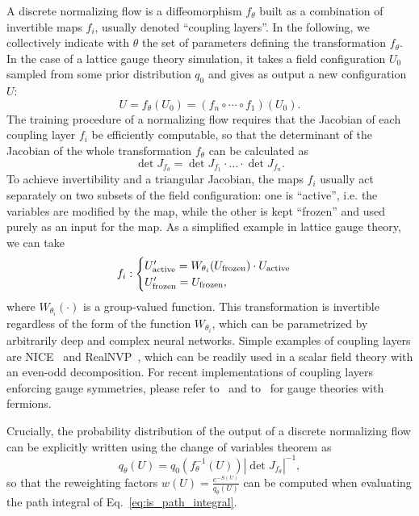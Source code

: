 \documentclass[12pt]{article}
\begin{document}
A discrete normalizing flow is a diffeomorphism $f_\theta$ built as a combination of invertible maps $f_i$, usually denoted ``coupling layers''. In the following, we collectively indicate with $\theta$ the set of parameters defining the transformation $f_\theta$.
In the case of a lattice gauge theory simulation, it takes a field configuration $U_0$ sampled from some prior distribution $q_0$ and gives as output a new configuration $U$:
\begin{equation}
\label{eq:nf_def}
    U = f_\theta (U_0) = (f_n \circ \cdots \circ f_1 )(U_0).
\end{equation}
The training procedure of a normalizing flow requires that the Jacobian of each coupling layer $f_i$ be efficiently computable, so that the determinant of the Jacobian of the whole transformation $f_\theta$ can be calculated as
\begin{equation}
    \det J_{f_\theta} = \det J_{f_1} \cdot \ldots \cdot \det J_{f_n}.
\end{equation}
To achieve invertibility and a triangular Jacobian, the maps $f_i$ usually act separately on two subsets of the field configuration: one is ``active'', i.e. the variables are modified by the map, while the other is kept ``frozen'' and used purely as an input for the map. As a simplified example in lattice gauge theory, we can take
\begin{equation}
f_i:
    \begin{cases}
        U'_{\rm active} = W_{\theta_i} (U_{\rm frozen}) \cdot U_{\rm active} \\
        U'_{\rm frozen} = U_{\rm frozen},
    \end{cases}
\end{equation}
where $W_{\theta_i}(\cdot)$ is a group-valued function.
This transformation is invertible regardless of the form of the function $W_{\theta_i}$, which can be parametrized by arbitrarily deep and complex neural networks. Simple examples of coupling layers are NICE~\cite{dinh2014nice} and RealNVP~\cite{dinh2016density}, which can be readily used in a scalar field theory with an even-odd decomposition. For recent implementations of coupling layers enforcing gauge symmetries, please refer to~\cite{Kanwar:2020xzo,Nagai:2021bhh,Abbott:2023thq} and to~\cite{Albergo:2021bna,Abbott:2022zhs} for gauge theories with fermions. 

Crucially, the probability distribution of the output of a discrete normalizing flow can be explicitly written using the change of variables theorem as
\begin{equation} \label{eq:flow_density}
    q_\theta (U) = q_0 ( f_\theta^{-1}(U) ) \left| \det J_{f_\theta} \right|^{-1},
\end{equation}
so that the reweighting factors $w(U) = \frac{e^{-S(U)}}{q_\theta(U)}$ can be computed when evaluating the path integral of Eq.~\eqref{eq:is_path_integral}.
\end{document}
